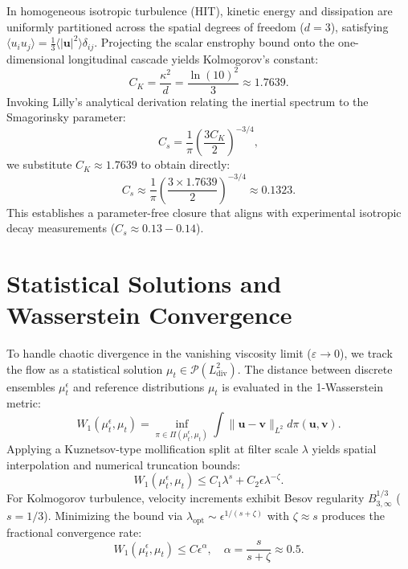 \documentclass[twocolumn,10pt,aps,pre,superscriptaddress]{revtex4-2}
\begin{document}
In homogeneous isotropic turbulence (HIT), kinetic energy and dissipation are uniformly partitioned across the spatial degrees of freedom ($d=3$), satisfying $\langle u_i u_j \rangle = \frac{1}{3}\langle |\mathbf{u}|^2 \rangle \delta_{ij}$. Projecting the scalar enstrophy bound onto the one-dimensional longitudinal cascade yields Kolmogorov's constant:
\begin{equation}
C_K = \frac{\kappa^2}{d} = \frac{\ln(10)^2}{3} \approx 1.7639.
\end{equation}
Invoking Lilly's analytical derivation \cite{Lilly92} relating the inertial spectrum to the Smagorinsky parameter:
\begin{equation}
C_s = \frac{1}{\pi} \left( \frac{3 C_K}{2} \right)^{-3/4},
\end{equation}
we substitute $C_K \approx 1.7639$ to obtain directly:
\begin{equation}
C_s \approx \frac{1}{\pi} \left( \frac{3 \times 1.7639}{2} \right)^{-3/4} \approx 0.1323.
\end{equation}
This establishes a parameter-free closure that aligns with experimental isotropic decay measurements ($C_s \approx 0.13 - 0.14$).

\section{Statistical Solutions and Wasserstein Convergence}
To handle chaotic divergence in the vanishing viscosity limit ($\varepsilon \to 0$), we track the flow as a statistical solution $\mu_t \in \mathcal{P}(L^2_{\text{div}})$. The distance between discrete ensembles $\mu_t^\epsilon$ and reference distributions $\mu_t$ is evaluated in the 1-Wasserstein metric:
\begin{equation}
W_1(\mu_t^\epsilon, \mu_t) = \inf_{\pi \in \Pi(\mu_t^\epsilon, \mu_t)} \int \|\mathbf{u} - \mathbf{v}\|_{L^2} d\pi(\mathbf{u},\mathbf{v}).
\end{equation}
Applying a Kuznetsov-type mollification split at filter scale $\lambda$ yields spatial interpolation and numerical truncation bounds:
\begin{equation}
W_1(\mu_t^\epsilon, \mu_t) \le C_1 \lambda^s + C_2 \epsilon \lambda^{-\zeta}.
\end{equation}
For Kolmogorov turbulence, velocity increments exhibit Besov regularity $B^{1/3}_{3,\infty}$ ($s=1/3$). Minimizing the bound via $\lambda_{\text{opt}} \sim \epsilon^{1/(s+\zeta)}$ with $\zeta \approx s$ produces the fractional convergence rate:
\begin{equation}
W_1(\mu_t^\epsilon, \mu_t) \le C \epsilon^\alpha, \quad \alpha = \frac{s}{s+\zeta} \approx 0.5.
\end{equation}
\end{document}
